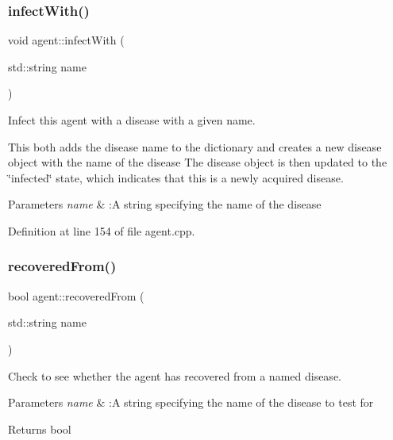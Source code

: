 \subsubsection{\texorpdfstring{infect\+With()}{infectWith()}}
{\footnotesize\ttfamily void agent\+::infect\+With (\begin{DoxyParamCaption}\item[{std\+::string}]{name }\end{DoxyParamCaption})}



Infect this agent with a disease with a given name. 

This both adds the disease name to the dictionary and creates a new disease object with the name of the disease The disease object is then updated to the \char`\"{}infected\char`\"{} state, which indicates that this is a newly acquired disease.


\begin{DoxyParams}{Parameters}
{\em name} & \+:A string specifying the name of the disease \\
\hline
\end{DoxyParams}


Definition at line 154 of file agent.\+cpp.

\mbox{\label{classagent_a0eee49d52e6c47d7b425bc72cf5caf67}} 
\subsubsection{\texorpdfstring{recovered\+From()}{recoveredFrom()}}
{\footnotesize\ttfamily bool agent\+::recovered\+From (\begin{DoxyParamCaption}\item[{std\+::string}]{name }\end{DoxyParamCaption})}



Check to see whether the agent has recovered from a named disease. 


\begin{DoxyParams}{Parameters}
{\em name} & \+:A string specifying the name of the disease to test for\\
\hline
\end{DoxyParams}
\begin{DoxyReturn}{Returns}
bool 
\end{DoxyReturn}


